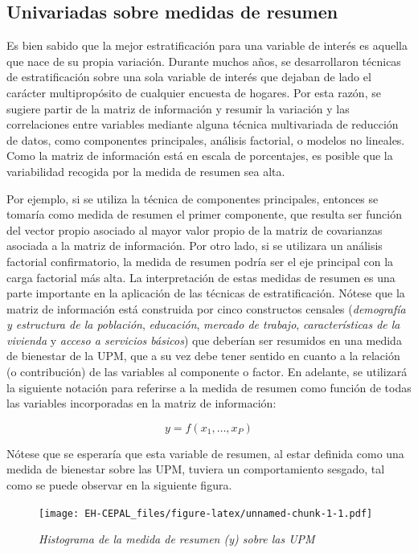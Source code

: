 \documentclass[12pt,spanish,]{book}
\begin{document}
\hypertarget{univariadas-sobre-medidas-de-resumen}{%
\subsection{Univariadas sobre medidas de resumen}\label{univariadas-sobre-medidas-de-resumen}}

Es bien sabido que la mejor estratificación para una variable de interés es aquella que nace de su propia variación. Durante muchos años, se desarrollaron técnicas de estratificación sobre una sola variable de interés que dejaban de lado el carácter multipropósito de cualquier encuesta de hogares. Por esta razón, se sugiere partir de la matriz de información y resumir la variación y las correlaciones entre variables mediante alguna técnica multivariada de reducción de datos, como componentes principales, análisis factorial, o modelos no lineales. Como la matriz de información está en escala de porcentajes, es posible que la variabilidad recogida por la medida de resumen sea alta.

Por ejemplo, si se utiliza la técnica de componentes principales, entonces se tomaría como medida de resumen el primer componente, que resulta ser función del vector propio asociado al mayor valor propio de la matriz de covarianzas asociada a la matriz de información. Por otro lado, si se utilizara un análisis factorial confirmatorio, la medida de resumen podría ser el eje principal con la carga factorial más alta. La interpretación de estas medidas de resumen es una parte importante en la aplicación de las técnicas de estratificación. Nótese que la matriz de información está construida por cinco constructos censales (\emph{demografía y estructura de la población}, \emph{educación}, \emph{mercado de trabajo}, \emph{características de la vivienda} y \emph{acceso a servicios básicos}) que deberían ser resumidos en una medida de bienestar de la UPM, que a su vez debe tener sentido en cuanto a la relación (o contribución) de las variables al componente o factor. En adelante, se utilizará la siguiente notación para referirse a la medida de resumen como función de todas las variables incorporadas en la matriz de información:

\[
y = f(x_1,\ldots, x_P)
\]

Nótese que se esperaría que esta variable de resumen, al estar definida como una medida de bienestar sobre las UPM, tuviera un comportamiento sesgado, tal como se puede observar en la siguiente figura.

\begin{figure}
\centering
\texttt{[image: EH-CEPAL\_files/figure-latex/unnamed-chunk-1-1.pdf]}
\caption{\label{fig:unnamed-chunk-1}\emph{Histograma de la medida de resumen (y) sobre las UPM}}
\end{figure}
\end{document}
